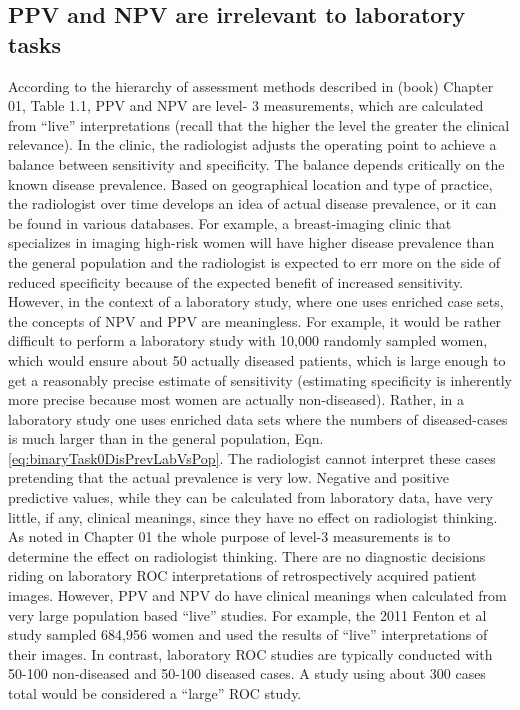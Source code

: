 \documentclass[
]{book}
\begin{document}
\hypertarget{binaryTask0NpvPpvIrrel2LabTasks}{%
\subsection{PPV and NPV are irrelevant to laboratory tasks}\label{binaryTask0NpvPpvIrrel2LabTasks}}

According to the hierarchy of assessment methods described in (book) Chapter 01, Table 1.1, PPV and NPV are level- 3 measurements, which are calculated from ``live'' interpretations (recall that the higher the level the greater the clinical relevance). In the clinic, the radiologist adjusts the operating point to achieve a balance between sensitivity and specificity. The balance depends critically on the known disease prevalence. Based on geographical location and type of practice, the radiologist over time develops an idea of actual disease prevalence, or it can be found in various databases. For example, a breast-imaging clinic that specializes in imaging high-risk women will have higher disease prevalence than the general population and the radiologist is expected to err more on the side of reduced specificity because of the expected benefit of increased sensitivity. However, in the context of a laboratory study, where one uses enriched case sets, the concepts of NPV and PPV are meaningless. For example, it would be rather difficult to perform a laboratory study with 10,000 randomly sampled women, which would ensure about 50 actually diseased patients, which is large enough to get a reasonably precise estimate of sensitivity (estimating specificity is inherently more precise because most women are actually non-diseased). Rather, in a laboratory study one uses enriched data sets where the numbers of diseased-cases is much larger than in the general population, Eqn. \eqref{eq:binaryTask0DisPrevLabVsPop}. The radiologist cannot interpret these cases pretending that the actual prevalence is very low. Negative and positive predictive values, while they can be calculated from laboratory data, have very little, if any, clinical meanings, since they have no effect on radiologist thinking. As noted in Chapter 01 the whole purpose of level-3 measurements is to determine the effect on radiologist thinking. There are no diagnostic decisions riding on laboratory ROC interpretations of retrospectively acquired patient images. However, PPV and NPV do have clinical meanings when calculated from very large population based ``live'' studies. For example, the 2011 Fenton et al study sampled 684,956 women and used the results of ``live'' interpretations of their images. In contrast, laboratory ROC studies are typically conducted with 50-100 non-diseased and 50-100 diseased cases. A study using about 300 cases total would be considered a ``large'' ROC study.
\end{document}
